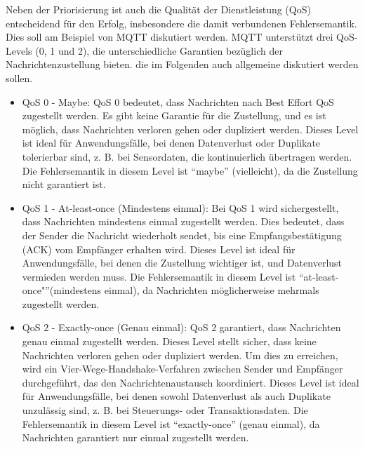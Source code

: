 Neben der Priorisierung ist auch die Qualität der Dienstleistung (QoS) entscheidend für den Erfolg, insbesondere die damit verbundenen Fehlersemantik. Dies soll am Beispiel von MQTT diskutiert werden.
MQTT unterstützt drei QoS-Levels (0, 1 und 2), die unterschiedliche Garantien bezüglich der Nachrichtenzustellung bieten. die im Folgenden  auch allgemeine diskutiert werden sollen. 
\begin{itemize}
\item QoS 0 - Maybe: QoS 0 bedeutet, dass Nachrichten nach Best Effort QoS zugestellt werden. Es gibt keine Garantie für die Zustellung, und es ist möglich, dass Nachrichten verloren gehen oder dupliziert werden. Dieses Level ist ideal für Anwendungsfälle, bei denen Datenverlust oder Duplikate tolerierbar sind, z. B. bei Sensordaten, die kontinuierlich übertragen werden. Die Fehlersemantik in diesem Level ist \enquote{maybe} (vielleicht), da die Zustellung nicht garantiert ist.
\item QoS 1 - At-least-once (Mindestens einmal):
Bei QoS 1 wird sichergestellt, dass Nachrichten mindestens einmal zugestellt werden. Dies bedeutet, dass der Sender die Nachricht wiederholt sendet, bis eine Empfangsbestätigung (ACK) vom Empfänger erhalten wird. Dieses Level ist ideal für Anwendungsfälle, bei denen die Zustellung wichtiger ist, und Datenverlust vermieden werden muss. Die Fehlersemantik in diesem Level ist \enquote{at-least-once"}(mindestens einmal), da Nachrichten möglicherweise mehrmals zugestellt werden.
\item QoS 2 - Exactly-once (Genau einmal):
QoS 2 garantiert, dass Nachrichten genau einmal zugestellt werden. Dieses Level stellt sicher, dass keine Nachrichten verloren gehen oder dupliziert werden. Um dies zu erreichen, wird ein Vier-Wege-Handshake-Verfahren zwischen Sender und Empfänger durchgeführt, das den Nachrichtenaustausch koordiniert. Dieses Level ist ideal für Anwendungsfälle, bei denen sowohl Datenverlust als auch Duplikate unzulässig sind, z. B. bei Steuerungs- oder Transaktionsdaten. Die Fehlersemantik in diesem Level ist \enquote{exactly-once} (genau einmal), da Nachrichten garantiert nur einmal zugestellt werden.
\end{itemize}

